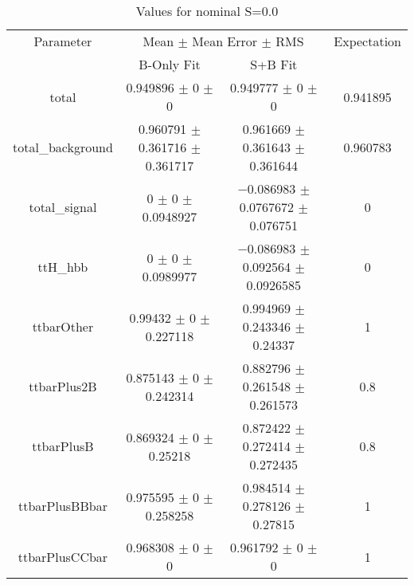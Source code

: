 \begin{table}
\centering
\caption{Values for nominal S=0.0}
\begin{tabular}{cccc}
\toprule
Parameter & \multicolumn{2}{c}{Mean $\pm$ Mean Error $\pm$ RMS} & Expectation\\
 & B-Only Fit & S+B Fit & \\
\midrule
total & \num{0.949896} $\pm$ \num{0} $\pm$ \num{0} & \num{0.949777} $\pm$ \num{0} $\pm$ \num{0} & \num{0.941895}\\
total\_background & \num{0.960791} $\pm$ \num{0.361716} $\pm$ \num{0.361717} & \num{0.961669} $\pm$ \num{0.361643} $\pm$ \num{0.361644} & \num{0.960783}\\
total\_signal & \num{0} $\pm$ \num{0} $\pm$ \num{0.0948927} & \num{-0.086983} $\pm$ \num{0.0767672} $\pm$ \num{0.076751} & \num{0}\\
ttH\_hbb & \num{0} $\pm$ \num{0} $\pm$ \num{0.0989977} & \num{-0.086983} $\pm$ \num{0.092564} $\pm$ \num{0.0926585} & \num{0}\\
ttbarOther & \num{0.99432} $\pm$ \num{0} $\pm$ \num{0.227118} & \num{0.994969} $\pm$ \num{0.243346} $\pm$ \num{0.24337} & \num{1}\\
ttbarPlus2B & \num{0.875143} $\pm$ \num{0} $\pm$ \num{0.242314} & \num{0.882796} $\pm$ \num{0.261548} $\pm$ \num{0.261573} & \num{0.8}\\
ttbarPlusB & \num{0.869324} $\pm$ \num{0} $\pm$ \num{0.25218} & \num{0.872422} $\pm$ \num{0.272414} $\pm$ \num{0.272435} & \num{0.8}\\
ttbarPlusBBbar & \num{0.975595} $\pm$ \num{0} $\pm$ \num{0.258258} & \num{0.984514} $\pm$ \num{0.278126} $\pm$ \num{0.27815} & \num{1}\\
ttbarPlusCCbar & \num{0.968308} $\pm$ \num{0} $\pm$ \num{0} & \num{0.961792} $\pm$ \num{0} $\pm$ \num{0} & \num{1}\\
\bottomrule
\end{tabular}
\end{table}